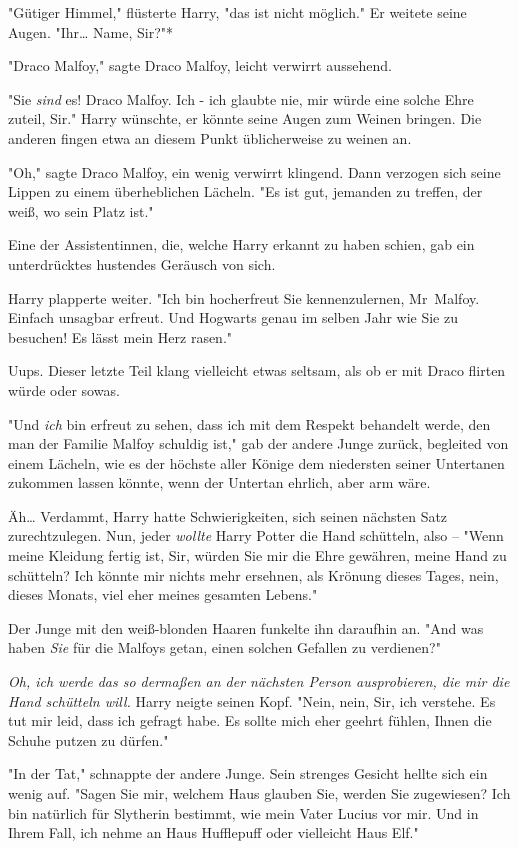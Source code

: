 {"Gütiger Himmel," flüsterte Harry, "das ist nicht möglich." Er weitete seine Augen. "Ihr… Name, Sir?"*

"Draco Malfoy," sagte Draco Malfoy, leicht verwirrt aussehend.

"Sie \emph{sind} es! Draco Malfoy. Ich - ich glaubte nie, mir würde eine solche Ehre zuteil, Sir." Harry wünschte, er könnte seine Augen zum Weinen bringen. Die anderen fingen etwa an diesem Punkt üblicherweise zu weinen an.

"Oh," sagte Draco Malfoy, ein wenig verwirrt klingend. Dann verzogen sich seine Lippen zu einem überheblichen Lächeln. "Es ist gut, jemanden zu treffen, der weiß, wo sein Platz ist."

Eine der Assistentinnen, die, welche Harry erkannt zu haben schien, gab ein unterdrücktes hustendes Geräusch von sich.

Harry plapperte weiter. "Ich bin hocherfreut Sie kennenzulernen, Mr~Malfoy. Einfach unsagbar erfreut. Und Hogwarts genau im selben Jahr wie Sie zu besuchen! Es lässt mein Herz rasen."

Uups. Dieser letzte Teil klang vielleicht etwas seltsam, als ob er mit Draco flirten würde oder sowas.

"Und \emph{ich} bin erfreut zu sehen, dass ich mit dem Respekt behandelt werde, den man der Familie Malfoy schuldig ist," gab der andere Junge zurück, begleited von einem Lächeln, wie es der höchste aller Könige dem niedersten seiner Untertanen zukommen lassen könnte, wenn der Untertan ehrlich, aber arm wäre.

Äh… Verdammt, Harry hatte Schwierigkeiten, sich seinen nächsten Satz zurechtzulegen. Nun, jeder \emph{wollte} Harry Potter die Hand schütteln, also -- "Wenn meine Kleidung fertig ist, Sir, würden Sie mir die Ehre gewähren, meine Hand zu schütteln? Ich könnte mir nichts mehr ersehnen, als Krönung dieses Tages, nein, dieses Monats, viel eher meines gesamten Lebens."

Der Junge mit den weiß-blonden Haaren funkelte ihn daraufhin an. "And was haben \emph{Sie} für die Malfoys getan, einen solchen Gefallen zu verdienen?"

\emph{Oh, ich werde das so dermaßen an der nächsten Person ausprobieren, die mir die Hand schütteln will.} Harry neigte seinen Kopf. "Nein, nein, Sir, ich verstehe. Es tut mir leid, dass ich gefragt habe. Es sollte mich eher geehrt fühlen, Ihnen die Schuhe putzen zu dürfen."

"In der Tat," schnappte der andere Junge. Sein strenges Gesicht hellte sich ein wenig auf. "Sagen Sie mir, welchem Haus glauben Sie, werden Sie zugewiesen? Ich bin natürlich für Slytherin bestimmt, wie mein Vater Lucius vor mir. Und in Ihrem Fall, ich nehme an Haus Hufflepuff oder vielleicht Haus Elf."

}

